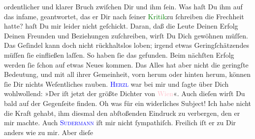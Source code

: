                ordentlicher und klarer Bruch zwiſchen Dir und ihm ſein. Was haſt Du ihm auf das
               infame, \label{K_L02758-4v}\label{K_L02758-4h} geantwortet, das er Dir nach ſeiner \textcolor{green}{Kritik}{}zu ſchreiben die Frechheit hatte?\pend
           \pstart
           \label{K_L02758-31v}\label{K_L02758-31h} haſt Du mir
               leider nicht geſchickt.\pend
           \pstart
           Daran, daß die Leute Deinen Erfolg Deinen Freunden und Beziehungen zuſchreiben, wirſt
               Du Dich gewöhnen müſſen. Das Geſindel  kann doch
               nicht rückhaltslos loben; irgend etwas Geringſchätzendes müſſen ſie einfließen
               laſſen. So haben ſie das gefunden. Beim nächſten Erfolg werden ſie ſchon auf etwas
               Neues kommen. Das Alles hat aber nicht die geringſte Bedeutung, {\pb}und mit all ihrer Gemeinheit, vorn herum oder hinten
               herum, können ſie Dir nichts Weſentliches 
               rauben.\pend
           \pstart
           \textsc{\textcolor{blue}{Herzl}{}\ledrightnote{\textcolor{blue}{Theodor Herzl}}} war bei mir und ſagte über Dich 
               wohlwollend: »Der iſt jetzt der größte Dichter von \textcolor{pink}{Wien}{}\ledrightnote{\textcolor{pink}{Wien}}«. Auch dieſen wirſt Du bald auf der Gegenſeite finden. Oh was für ein
               widerliches Subject! Ich habe nicht die Kraft  gehabt, ihm diesmal den abſtoßenden Eindruck zu verbergen, den er mir
               machte.\pend
           \pstart
           {\pb}Auch \textsc{\textcolor{blue}{Sudermann}{}\ledrightnote{\textcolor{blue}{Hermann Sudermann}}} iſt mir nicht ſympathiſch. Freilich iſt er zu Dir anders wie zu mir. Aber dieſe
